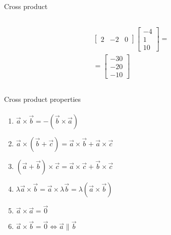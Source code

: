 \documentclass[aspectratio=169,notes]{beamer}
\begin{document}
\begin{frame}[t]{Cross product}
\begin{columns}[T,onlytextwidth]
\begin{column}{0.49\textwidth}
\begin{align*}
\begin{bmatrix}
                    2 & -2  & 0 
                    \end{bmatrix}\begin{bmatrix}-4\\ 1\\ 10 \end{bmatrix}= \\ = \begin{bmatrix} -30\\-20\\ -10 \end{bmatrix}
            \end{align*}
        \end{column}
    \end{columns}
\end{frame}

\begin{frame}[t]{Cross product properties}
\framesubtitle{}
    \begin{enumerate}
        \item $\vec{a}\times\vec{b} = -(\vec{b}\times\vec{a})$
        \item $\vec{a}\times(\vec{b}+\vec{c})=\vec{a}\times\vec{b}+ \vec{a}\times\vec{c}$
        \item $(\vec{a}+\vec{b})\times\vec{c}=\vec{a}\times\vec{c}+ \vec{b}\times\vec{c}$
        \item $\lambda\vec{a}\times\vec{b}=\vec{a}\times\lambda\vec{b}=\lambda(\vec{a}\times\vec{b})$
        \item $\vec{a}\times\vec{a}=\vec{0}$
        \item $\vec{a}\times\vec{b}=\vec{0} \Leftrightarrow \vec{a}\parallel \vec{b}$
    \end{enumerate}
\end{frame}
\end{document}
